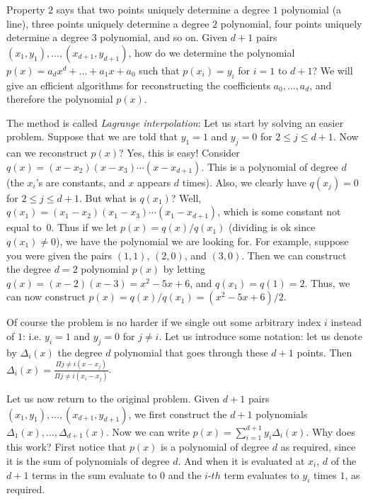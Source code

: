 \documentclass[11pt,fleqn]{article}
\begin{document}
Property $2$ says that two points uniquely determine a degree $1$ 
polynomial (a line), three points uniquely determine a degree $2$ 
polynomial, four points uniquely determine a degree $3$ polynomial, 
and so on.  Given $d+1$ pairs $(x_1, y_1), \ldots, (x_{d+1}, y_{d+1})$,
how do we determine the polynomial $p(x) = a_d x^d + \ldots + a_1 x + a_0$
such that $p(x_i) = y_i$ for $i = 1$ to $d+1$? We will give an efficient algorithms for reconstructing the coefficients
$a_0, \ldots, a_d$, and therefore the polynomial $p(x)$. 

The method is called {\em Lagrange interpolation}:
Let us start by solving an easier problem. Suppose that we 
are told that $y_1 =1$ and $y_j = 0$ for $2 \leq j \leq d+1$. Now 
can we reconstruct $p(x)$? Yes, this is easy! Consider 
$q(x) = (x - x_2)(x - x_3) \cdots (x-x_{d+1})$. This is a 
polynomial of degree $d$ (the $x_i$'s are constants, and 
$x$ appears $d$ times). Also, we clearly have
$q(x_j) = 0$ for $2 \leq j \leq d+1$.  But what is $q(x_1)$? 
Well, $q(x_1) = (x_1 - x_2)(x_1 - x_3) \cdots (x_1 - x_{d+1})$,
which is some constant not equal to~$0$. 
Thus if we let $p(x) = q(x)/q(x_1)$ (dividing is ok since 
$q(x_1) \neq 0$), we have the polynomial we are looking for.
For example, suppose you were given the pairs $(1,1)$, $(2,0)$, and
$(3,0)$. Then we can construct the degree $d = 2$ polynomial $p(x)$ by letting
$q(x) = (x - 2)(x - 3) = x^2 - 5x + 6$, and $q(x_1) = q(1) = 2$.
Thus, we can now construct $p(x) = q(x)/q(x_1) = (x^2 - 5x + 6)/2$.

Of course the problem is no harder if we single out some arbitrary 
index $i$ instead of $1$: i.e. $y_i = 1$ and $y_j = 0$ for $j \neq i$. 
Let us introduce some notation: let us denote by $\Delta_i(x)$ 
the degree $d$ polynomial that goes through these $d+1$ points. 
Then $\Delta_i(x) = \frac{\Pi{j\neq i} (x-x_j)}{\Pi{j\neq i} (x_i-x_j)}$.

Let us now return to the original problem. Given 
$d+1$ pairs $(x_1, y_1), \ldots, (x_{d+1}, y_{d+1})$, we 
first construct the $d+1$ polynomials 
$\Delta_{1}(x), \ldots , \Delta_{d+1}(x)$. Now 
we can write $p(x) = \sum_{i = 1}^{d+1} y_i \Delta_i(x)$.
Why does this work? First notice that $p(x)$ is a polynomial 
of degree $d$ as required, since it is the sum of polynomials 
of degree $d$. And when it is evaluated at $x_i$, $d$ of the 
$d+1$ terms in the sum evaluate to $0$ and the $i$-$th$ term 
evaluates to $y_i$ times $1$, as required. 
\end{document}
